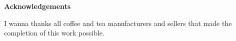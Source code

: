\begin{center}
\LARGE\textbf {Acknowledgements}
\end{center}
\vspace{5pt}

\noindent I wanna thanks all coffee and tea manufacturers and sellers that made the completion of this work possible. 
